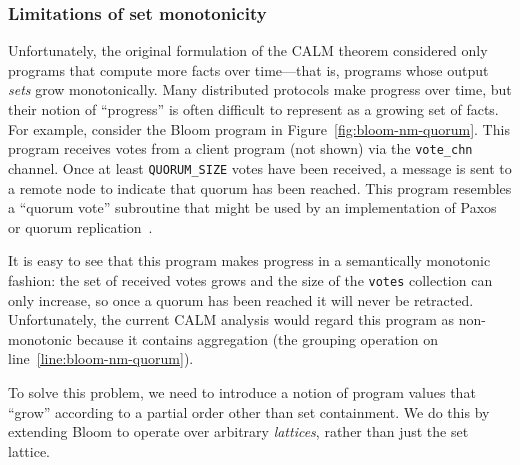 \subsubsection{Limitations of set monotonicity}
Unfortunately, the original formulation of the CALM theorem considered only
programs that compute more facts over time---that is, programs whose output
\emph{sets} grow monotonically. Many distributed protocols make progress
over time, but their notion of ``progress'' is often difficult to represent as a
growing set of facts. For example, consider the Bloom program in
Figure~\ref{fig:bloom-nm-quorum}. This program receives votes from a client
program (not shown) via the \texttt{vote\_chn} channel. Once at least
\texttt{QUORUM\_SIZE} votes have been received, a message is sent to a remote
node to indicate that quorum has been reached. This program resembles a ``quorum
vote'' subroutine that might be used by an implementation of
Paxos~\cite{Lamport1998} or quorum replication~\cite{Gifford1979}.

It is easy to see that this program makes progress in a semantically monotonic
fashion: the set of received votes grows and the size of the \texttt{votes}
collection can only increase, so once a quorum has been reached it will never be
retracted. Unfortunately, the current CALM analysis would regard this program as
non-monotonic because it contains aggregation (the grouping operation on
line~\ref{line:bloom-nm-quorum}).

To solve this problem, we need to introduce a notion of program values that
``grow'' according to a partial order other than set containment. We do this by
extending Bloom to operate over arbitrary \emph{lattices}, rather than just the
set lattice.


